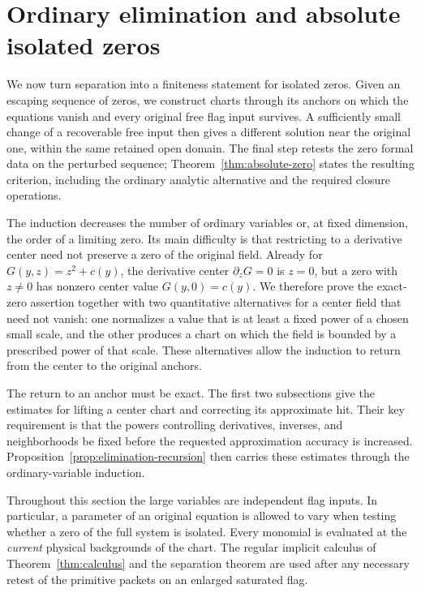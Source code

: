 \section{Ordinary elimination and absolute isolated zeros}
\label{sec:elimination}

We now turn separation into a finiteness statement for isolated zeros.
Given an escaping sequence of zeros, we construct charts through its
anchors on which the equations vanish and every original free flag
input survives.  A sufficiently small change of a recoverable free
input then gives a different solution near the original one, within the
same retained open domain.  The final step retests the zero formal data on the perturbed sequence;
Theorem~\ref{thm:absolute-zero} states the resulting criterion, including
the ordinary analytic alternative and the required closure operations.

The induction decreases the number of ordinary variables or, at fixed
dimension, the order of a limiting zero.  Its main difficulty is
that restricting to a derivative center need not preserve a zero of
the original field.  Already for $G(y,z)=z^2+c(y)$, the derivative
center $\partial_zG=0$ is $z=0$, but a zero with $z\ne0$ has nonzero
center value $G(y,0)=c(y)$.  We therefore prove the exact-zero
assertion together with two quantitative alternatives for a
center field that need not vanish: one normalizes a value that is at
least a fixed power of a chosen small scale, and the other produces a chart on which the field
is bounded by a prescribed power of that scale.  These alternatives
allow the induction to return from the center to the original anchors.

The return to an anchor must be exact.  The first two subsections give
the estimates for lifting a center chart and correcting its approximate
hit.  Their key requirement is that the powers controlling derivatives,
inverses, and neighborhoods be fixed before the requested approximation
accuracy is increased.  Proposition~\ref{prop:elimination-recursion}
then carries these estimates through the ordinary-variable induction.

Throughout this section the large variables are independent flag
inputs.  In particular, a parameter of an original equation is allowed
to vary when testing whether a zero of the full system is isolated.
Every monomial is evaluated at the \emph{current} physical backgrounds
of the chart.  The regular implicit calculus of
Theorem~\ref{thm:calculus} and the separation theorem are used after
any necessary retest of the primitive packets on an enlarged saturated
flag.

